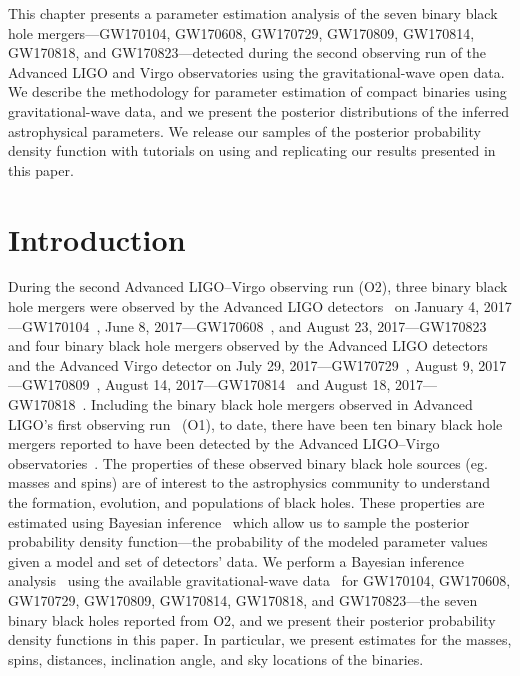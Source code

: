 \newcommand{\pset}{\vartheta}
\newcommand{\sv}[1]{\textcolor{magenta}{#1}}
\newcommand{\likelihood}{p(\vec{d}(t)|\vec{\pset},H)}
\newcommand{\prior}{p(\vec{\pset}|H)}
\newcommand{\evidence}{p(\vec{d}(t)|H)}
\newcommand{\posterior}{p(\vec{\pset}|\vec{d}(t),H)}

This chapter presents a parameter estimation analysis of the seven binary black hole mergers---GW170104, GW170608, GW170729, GW170809, GW170814, GW170818, and GW170823---detected during the second observing run of the Advanced LIGO and Virgo observatories using the gravitational-wave open data. We describe the methodology for parameter estimation of compact binaries using gravitational-wave data, and we present the posterior distributions of the inferred astrophysical parameters. We release our samples of the posterior probability density function with tutorials on using and replicating our results presented in this paper.

\section{Introduction} \label{sec:intro}

During the second Advanced LIGO--Virgo observing run (O2), three binary black hole mergers were observed by the Advanced LIGO detectors~\cite{TheLIGOScientific:2014jea} on January 4, 2017---GW170104~\cite{Abbott:2017vtc}, June 8, 2017---GW170608~\cite{Abbott:2017gyy}, and August 23, 2017---GW170823~\cite{LIGOScientific:2018mvr} and four binary black hole mergers observed by the Advanced LIGO detectors and the Advanced Virgo detector\cite{TheVirgo:2014hva} on July 29, 2017---GW170729~\cite{LIGOScientific:2018mvr}, August 9, 2017---GW170809~\cite{LIGOScientific:2018mvr}, August 14, 2017---GW170814~\cite{Abbott:2017oio} and August 18, 2017---GW170818~\cite{LIGOScientific:2018mvr}. Including the binary black hole mergers observed in Advanced LIGO's first observing run~\cite{TheLIGOScientific:2016pea,Nitz:2018imz} (O1), to date, there have been ten binary black hole mergers reported to have been detected by the Advanced LIGO--Virgo observatories~\cite{TheLIGOScientific:2016pea,Nitz:2018imz,Abbott:2017vtc,Abbott:2017gyy,Abbott:2017oio,LIGOScientific:2018mvr}. The properties of these observed binary black hole sources (eg. masses and spins) are of interest to the astrophysics community to understand the formation, evolution, and populations of black holes. These properties are estimated using Bayesian inference~\cite{Bayes:1763,Jaynes:2003jaq} which allow us to sample the posterior probability density function---the probability of the modeled parameter values given a model and set of detectors' data. We perform a Bayesian inference analysis~\cite{Christensen:2001cr,Biwer:2018osg} using the available gravitational-wave data~\cite{Vallisneri:2014vxa} for GW170104, GW170608, GW170729, GW170809, GW170814, GW170818, and GW170823---the seven binary black holes reported from O2, and we present their posterior probability density functions in this paper. In particular, we present estimates for the masses, spins, distances, inclination angle, and sky locations of the binaries. 


